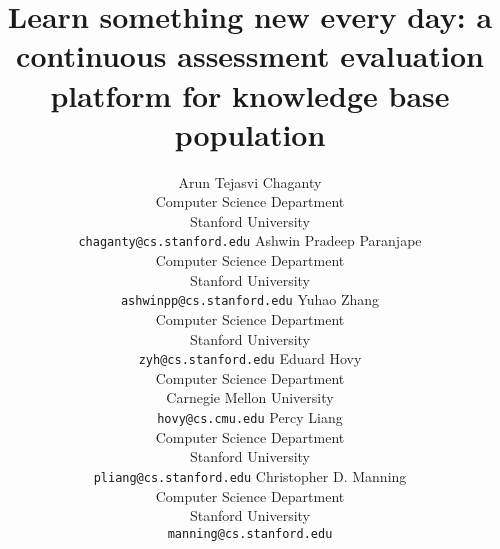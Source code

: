 \documentclass[11pt]{article}
\title{Learn something new every day: a continuous assessment evaluation platform for knowledge base population}
\author{%
  Arun Tejasvi Chaganty \\
  Computer Science Department \\
  Stanford University \\
  {\tt chaganty@cs.stanford.edu}
\And%
  Ashwin Pradeep Paranjape \\
  Computer Science Department \\
  Stanford University \\
  {\tt ashwinpp@cs.stanford.edu}
\And%
  Yuhao Zhang \\
  Computer Science Department \\
  Stanford University \\
  {\tt zyh@cs.stanford.edu}
\And%
  Eduard Hovy \\
  Computer Science Department \\
  Carnegie Mellon University \\
  {\tt hovy@cs.cmu.edu}
\And%
  Percy Liang \\
  Computer Science Department \\
  Stanford University \\
  {\tt pliang@cs.stanford.edu}
\And%
  Christopher D. Manning \\
  Computer Science Department \\
  Stanford University \\
  {\tt manning@cs.stanford.edu}
}
\date{}
\begin{document}
\maketitle

\begin{abstract}

\end{abstract}









%


\end{document}

